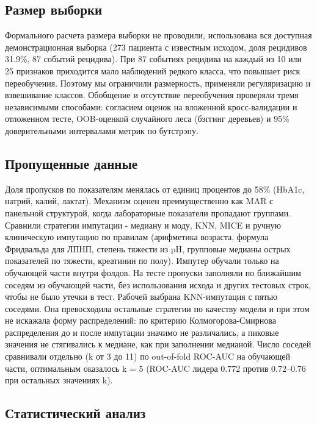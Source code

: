 \documentclass[12pt,a4paper]{article}
\begin{document}
\subsection{Размер выборки}

Формального расчета размера выборки не проводили, использована вся доступная
демонстрационная выборка (273 пациента с известным исходом, доля рецидивов 31.9\%, 87
событий рецидива). При 87 событиях рецидива на каждый из 10 или 25 признаков приходится
мало наблюдений редкого класса, что повышает риск переобучения. Поэтому мы ограничили
размерность, применяли регуляризацию и взвешивание классов. Обобщение и отсутствие
переобучения проверяли тремя независимыми способами: согласием оценок на вложенной
кросс-валидации и отложенном тесте, OOB-оценкой случайного леса (бэггинг деревьев) и 95\%
доверительными интервалами метрик по бутстрэпу.

\subsection{Пропущенные данные}

Доля пропусков по показателям менялась от единиц процентов до 58\% (HbA1c, натрий, калий,
лактат). Механизм оценен преимущественно как MAR с панельной структурой, когда лабораторные
показатели пропадают группами. Сравнили стратегии импутации - медиану и моду, KNN, MICE и
ручную клиническую импутацию по правилам (арифметика возраста, формула Фридвальда для ЛПНП,
степень тяжести из pH, групповые медианы острых показателей по тяжести, креатинин по полу).
Импутер обучали только на обучающей части внутри фолдов. На тесте пропуски заполняли по
ближайшим соседям из обучающей части, без использования исхода и других тестовых строк,
чтобы не было утечки в тест. Рабочей выбрана KNN-импутация с пятью соседями. Она превосходила остальные стратегии по
качеству модели и при этом не искажала форму распределений: по критерию
Колмогорова-Смирнова распределения до и после импутации значимо не различались, а пиковые
значения не стягивались к медиане, как при заполнении медианой. Число соседей сравнивали
отдельно (k от 3 до 11) по out-of-fold ROC-AUC на обучающей части, оптимальным оказалось
k = 5 (ROC-AUC лидера 0.772 против 0.72--0.76 при остальных значениях k).

\subsection{Статистический анализ}
\end{document}
